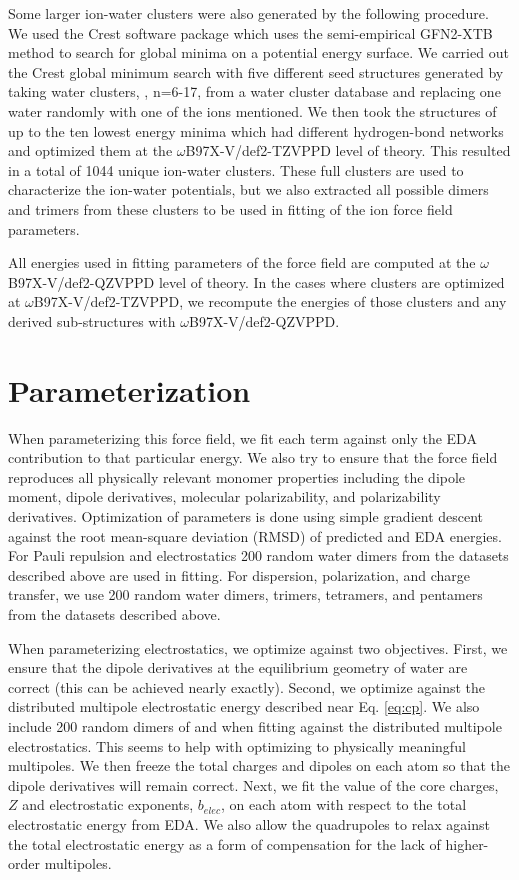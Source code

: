 \documentclass[journal=jacsat,manuscript=article]{achemso}
\begin{document}
Some larger ion-water clusters were also generated by the following procedure. We used the Crest software package\cite{pracht2020automated} which uses the semi-empirical GFN2-XTB\cite{bannwarth2019gfn2} method to search for global minima on a potential energy surface. We carried out the Crest global minimum search with five different seed structures generated by taking water clusters, , n=6-17, from a water cluster database\cite{rakshit2019atlas} and replacing one water randomly with one of the ions mentioned. We then took the structures of up to the ten lowest energy minima which had different hydrogen-bond networks and optimized them at the $\omega$B97X-V/def2-TZVPPD level of theory. This resulted in a total of 1044 unique ion-water clusters. These full clusters are used to characterize the ion-water potentials, but we also extracted all possible dimers and trimers from these clusters to be used in fitting of the ion force field parameters.

All energies used in fitting parameters of the force field are computed at the $\omega$B97X-V/def2-QZVPPD level of theory. In the cases where clusters are optimized at $\omega$B97X-V/def2-TZVPPD, we recompute the energies of those clusters and any derived sub-structures with $\omega$B97X-V/def2-QZVPPD.

\section*{Parameterization}

When parameterizing this force field, we fit each term against only the EDA contribution to that particular energy. We also try to ensure that the force field reproduces all physically relevant monomer properties including the dipole moment, dipole derivatives, molecular polarizability, and polarizability derivatives. Optimization of parameters is done using simple gradient descent against the root mean-square deviation (RMSD) of predicted and EDA energies. For Pauli repulsion and electrostatics 200 random water dimers from the datasets described above are used in fitting. For dispersion, polarization, and charge transfer, we use 200 random water dimers, trimers, tetramers, and pentamers from the datasets described above.

When parameterizing electrostatics, we optimize against two objectives. First, we ensure that the dipole derivatives at the equilibrium geometry of water are correct (this can be achieved nearly exactly). Second, we optimize against the distributed multipole electrostatic energy described near Eq. \ref{eq:cp}. We also include 200 random dimers of  and  when fitting against the distributed multipole electrostatics. This seems to help with optimizing to physically meaningful multipoles. We then freeze the total charges and dipoles on each atom so that the dipole derivatives will remain correct. Next, we fit the value of the core charges, $Z$ and electrostatic exponents, $b_{elec}$, on each atom with respect to the total electrostatic energy from EDA. We also allow the quadrupoles to relax against the total electrostatic energy as a form of compensation for the lack of higher-order multipoles.
\end{document}
